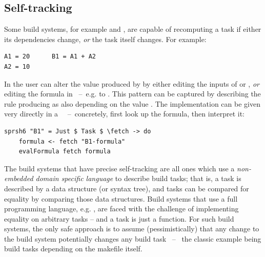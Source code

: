 
\subsection{Self-tracking}\label{sec-tracking-aspects}

Some build systems, for example \Excel and \Ninja, are capable of recomputing a
task if either its dependencies change, \emph{or} the task itself changes. For
example:

\vspace{1mm}
\begin{verbatim}
A1 = 20      B1 = A1 + A2
A2 = 10
\end{verbatim}
\vspace{1mm}

\noindent
In \Excel the user can alter the value produced by  by either editing
the inputs of  or , \emph{or} editing the formula in
~--~e.g. to . This pattern can be captured by describing
the rule producing  as also depending on the value .
The implementation can be given very directly in a
~~--~concretely, first look up the formula, then interpret
it:

\vspace{1mm}
\begin{verbatim}
sprsh6 "B1" = Just $ Task $ \fetch -> do
    formula <- fetch "B1-formula"
    evalFormula fetch formula
\end{verbatim}
\vspace{1mm}

\noindent
The build systems that have precise self-tracking are all ones which
use a \emph{non-embedded domain specific language} to describe build
tasks; that is, a task is described by a data structure (or syntax
tree), and tasks can be compared for equality by comparing those data
structures. Build systems that use a full programming language, e.g. \Shake,
are faced with the challenge of implementing equality on arbitrary
tasks -- and a task is just a function.  For such build systems, the
only safe approach is to assume (pessimistically) that any
change to the build system potentially changes any build task ~--~ the
classic example being build tasks depending on the makefile itself.


